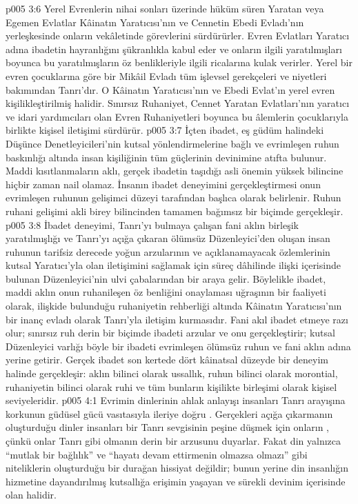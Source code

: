 \vs p005 3:6 Yerel Evrenlerin nihai sonları üzerinde hüküm süren Yaratan veya Egemen Evlatlar Kâinatın Yaratıcısı’nın ve Cennetin Ebedi Evladı’nın yerleşkesinde onların vekâletinde görevlerini sürdürürler. Evren Evlatları Yaratıcı adına ibadetin hayranlığını şükranlıkla kabul eder ve onların ilgili yaratılmışları boyunca bu yaratılmışların öz benlikleriyle ilgili ricalarına kulak verirler. Yerel bir evren çocuklarına göre bir Mikâil Evladı tüm işlevsel gerekçeleri ve niyetleri bakımından Tanrı’dır. O Kâinatın Yaratıcısı’nın ve Ebedi Evlat’ın yerel evren kişilikleştirilmiş halidir. Sınırsız Ruhaniyet, Cennet Yaratan Evlatları’nın yaratıcı ve idari yardımcıları olan Evren Ruhaniyetleri boyunca bu âlemlerin çocuklarıyla birlikte kişisel iletişimi sürdürür.
\vs p005 3:7 İçten ibadet, eş güdüm halindeki Düşünce Denetleyicileri’nin kutsal yönlendirmelerine bağlı ve evrimleşen ruhun baskınlığı altında insan kişiliğinin tüm güçlerinin devinimine atıfta bulunur. Maddi kısıtlanmaların aklı, gerçek ibadetin taşıdığı asli önemin yüksek bilincine hiçbir zaman nail olamaz. İnsanın ibadet deneyimini gerçekleştirmesi onun evrimleşen ruhunun gelişimci düzeyi tarafından başlıca olarak belirlenir. Ruhun ruhani gelişimi akli birey bilincinden tamamen bağımsız bir biçimde gerçekleşir.
\vs p005 3:8 İbadet deneyimi, Tanrı’yı bulmaya çalışan fani aklın birleşik yaratılmışlığı ve Tanrı’yı açığa çıkaran ölümsüz Düzenleyici’den oluşan insan ruhunun tarifsiz derecede yoğun arzularının ve açıklanamayacak özlemlerinin kutsal Yaratıcı’yla olan iletişimini sağlamak için süreç dâhilinde ilişki içerisinde bulunan Düzenleyici’nin ulvi çabalarından bir araya gelir. Böylelikle ibadet, maddi aklın onun ruhanileşen öz benliğini onaylaması uğraşının bir faaliyeti olarak, ilişkide bulunduğu ruhaniyetin rehberliği altında Kâinatın Yaratıcısı’nın bir inanç evladı olarak Tanrı’yla iletişim kurmasıdır. Fani akıl ibadet etmeye razı olur; sınırsız ruh derin bir biçimde ibadeti arzular ve onu gerçekleştirir; kutsal Düzenleyici varlığı böyle bir ibadeti evrimleşen ölümsüz ruhun ve fani aklın adına yerine getirir. Gerçek ibadet son kertede dört kâinatsal düzeyde bir deneyim halinde gerçekleşir: aklın bilinci olarak ussallık, ruhun bilinci olarak morontial, ruhaniyetin bilinci olarak ruhi ve tüm bunların kişilikte birleşimi olarak kişisel seviyeleridir.
\vs p005 4:1 Evrimin dinlerinin ahlak anlayışı insanları Tanrı arayışına korkunun güdüsel gücü vasıtasıyla ileriye doğru . Gerçekleri açığa çıkarmanın oluşturduğu dinler insanları bir Tanrı sevgisinin peşine düşmek için onların , çünkü onlar Tanrı gibi olmanın derin bir arzusunu duyarlar. Fakat din yalnızca “mutlak bir bağlılık” ve “hayatı devam ettirmenin olmazsa olmazı” gibi niteliklerin oluşturduğu bir durağan hissiyat değildir; bunun yerine din insanlığın hizmetine dayandırılmış kutsallığa erişimin yaşayan ve sürekli devinim içerisinde olan halidir.
